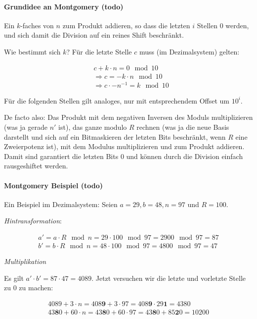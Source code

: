 \paragraph{Grundidee an Montgomery (todo)}

Ein $k$-faches von $n$ zum Produkt addieren, so dass die letzten $i$ Stellen 0 werden, und sich damit die
Division auf ein reines Shift beschränkt.  

Wie bestimmt sich $k$? \newline
Für die letzte Stelle $c$ muss (im Dezimalsystem) gelten: 

\begin{align*}
&c + k\cdot n = 0 \mod 10  \\
 &\Rightarrow c = -k \cdot n \mod 10 \\
 &\Rightarrow c \cdot -n^{-1} = k \mod 10
\end{align*}

Für die folgenden Stellen gilt analoges, nur mit entsprechendem Offset um $10^i$.  


De facto also:
Das Produkt mit dem negativen Inversen des Moduls multiplizieren (was ja gerade $n'$ ist), das ganze
modulo $R$ rechnen (was ja die neue Basis darstellt und sich auf ein Bitmaskieren der letzten Bits
beschränkt, wenn $R$ eine Zweierpotenz ist), mit dem Modulus multiplizieren und zum Produkt
addieren. Damit sind garantiert die letzten Bits 0 und können durch die Division einfach rausgeshiftet
werden.


\paragraph{Montgomery Beispiel (todo)}

Ein Beispiel im Dezimalsystem: Seien $a = 29, b = 48, n = 97$ und $R = 100$.

\textit{Hintransformation}:

\begin{align*}
    a' = a \cdot R \mod n = 29 \cdot 100 \mod 97 = 2900 \mod 97 = 87 \\
    b' = b \cdot R \mod n = 48 \cdot 100 \mod 97 = 4800 \mod 97 = 47
\end{align*}

\textit{Multiplikation}

Es gilt $a' \cdot b' = 87 \cdot 47 = 4089$. Jetzt versuchen wir die letzte und vorletzte Stelle zu 0 zu machen:

\begin{align*}
    4089 + 3\cdot n = 408\textbf{9} + 3 \cdot 97 = 408\textbf{9} \cdot 29\textbf{1} = 4380 \\
    43\textbf{8}0 + 60 \cdot n = 43\textbf{8}0 + 60 \cdot 97 = 43\textbf{8}0 + 85\textbf{2}0 = 10200
\end{align*}

